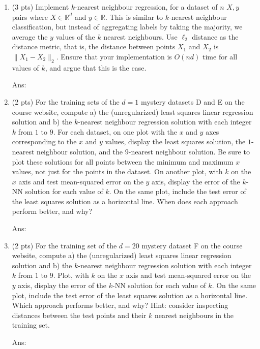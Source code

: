 \documentclass[10pt,letter,notitlepage]{article}
\newcommand{\ans}[1]{{\color{orange}\textsf{Ans}: #1}}
\newcounter{exercise}
\begin{document}
\begin{exercise}
  \begin{enumerate}
    \item (3 pts) Implement $k$-nearest neighbour regression, for a dataset of $n$ $X, y$ pairs where $X \in \mathbb{R}^d$ and $y \in \mathbb{R}$. 
      This is similar to $k$-nearest neighbour classification, but instead of aggregating labels by taking the majority, we average the $y$ values of the $k$ nearest neighbours.
      Use $\ell_2$ distance as the distance metric, that is, the distance between points $X_1$ and $X_2$ is $\|X_1 - X_2\|_2$.
      Ensure that your implementation is $O(nd)$ time for all values of $k$, and argue that this is the case.

    \ans{}
    \item (2 pts) For the training sets of the $d=1$ mystery datasets D and E on the course website, compute a) the (unregularized) least squares linear regression solution and b) the $k$-nearest neighbour regression solution with each integer $k$ from $1$ to $9$.
      For each dataset, on one plot with the $x$ and $y$ axes corresponding to the $x$ and $y$ values, display the least squares solution, the $1$-nearest neighbour solution, and the $9$-nearest neighbour solution. 
      Be sure to plot these solutions for all points between the minimum and maximum $x$ values, not just for the points in the dataset.
      On another plot, with $k$ on the $x$ axis and test mean-squared error on the $y$ axis, display the error of the $k$-NN solution for each value of $k$. 
      On the same plot, include the test error of the least squares solution as a horizontal line.
      When does each approach perform better, and why? 

    \ans{}
    \item (2 pts) For the training set of the $d = 20$ mystery dataset F on the course website, compute a) the (unregularized) least squares linear regression solution and b) the $k$-nearest neighbour regression solution with each integer $k$ from $1$ to $9$.
      Plot, with $k$ on the $x$ axis and test mean-squared error on the $y$ axis, display the error of the $k$-NN solution for each value of $k$. 
      On the same plot, include the test error of the least squares solution as a horizontal line.
      Which approach performs better, and why? 
      Hint: consider inspecting distances between the test points and their $k$ nearest neighbours in the training set.

    \ans{}
  \end{enumerate}
\end{exercise}
\end{document}
